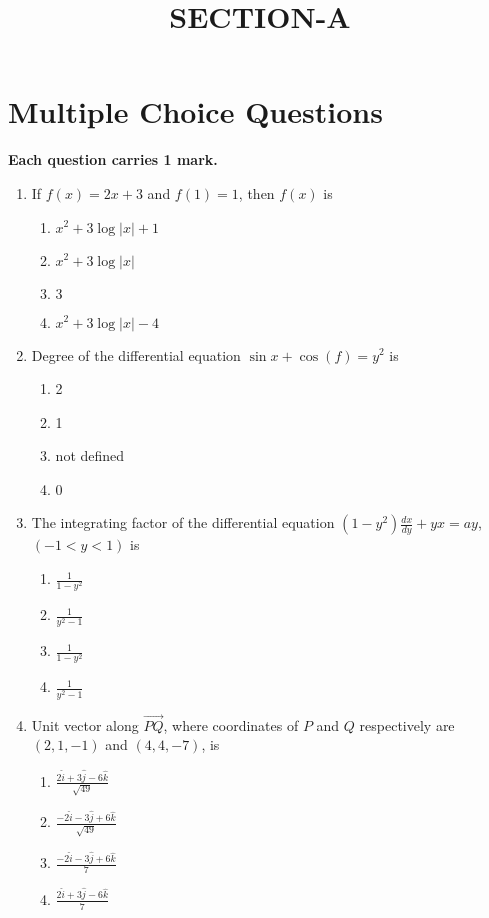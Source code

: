 \documentclass{article}
\title{SECTION-A}
\author{}
\date{}
\begin{document}
\maketitle

\section*{Multiple Choice Questions}

\vspace{1em} %

\textbf{Each question carries 1 mark.}



\begin{enumerate}
\item If $f(x) = 2x + 3$ and $f(1) = 1$, then $f(x)$ is
\begin{enumerate}
\item $x^2 + 3 \log |x| + 1$
\item $x^2 + 3 \log |x|$
\item $3$
\item $x^2 + 3 \log |x| - 4$
\end{enumerate}

\item Degree of the differential equation $\sin x + \cos (f) = y^2$ is
\begin{enumerate}
\item 2
\item 1
\item not defined
\item 0
\end{enumerate}

\item The integrating factor of the differential equation $(1 - y^2) \frac{dx}{dy} + yx = ay$, $(-1 < y < 1)$ is
\begin{enumerate}
\item $\frac{1}{1 - y^2}$
\item $\frac{1}{y^2 - 1}$
\item $\frac{1}{1 - y^2}$
\item $\frac{1}{y^2 - 1}$
\end{enumerate}

\item Unit vector along $\overrightarrow{PQ}$, where coordinates of $P$ and $Q$ respectively are $(2, 1, -1)$ and $(4, 4, -7)$, is
\begin{enumerate}
\item $\frac{2\hat{i} + 3\hat{j} - 6\hat{k}}{\sqrt{49}}$
\item $\frac{-2\hat{i} - 3\hat{j} + 6\hat{k}}{\sqrt{49}}$
\item $\frac{-2\hat{i} - 3\hat{j} + 6\hat{k}}{7}$
\item $\frac{2\hat{i} + 3\hat{j} - 6\hat{k}}{7}$
\end{enumerate}


\end{enumerate}
\end{document}
